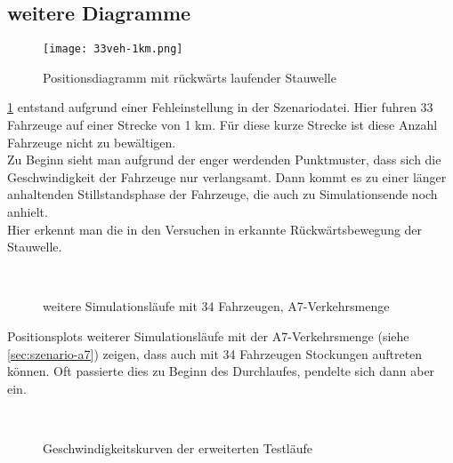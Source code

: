 \newpage

\subsection{weitere Diagramme}


\begin{figure}[hptb]
 \centering
 \texttt{[image: 33veh-1km.png]}
 \caption{Positionsdiagramm mit rückwärts laufender Stauwelle}
 \label{figure:33veh-1km}
\end{figure}

\cref{figure:33veh-1km} entstand aufgrund einer Fehleinstellung in der Szenariodatei.
Hier fuhren 33 Fahrzeuge auf einer Strecke von 1 km.
Für diese kurze Strecke ist diese Anzahl Fahrzeuge nicht zu bewältigen.
\\
Zu Beginn sieht man aufgrund der enger werdenden Punktmuster, dass sich die Geschwindigkeit der Fahrzeuge nur verlangsamt. Dann kommt es zu einer länger anhaltenden Stillstandsphase der Fahrzeuge, die auch zu Simulationsende noch anhielt.
\\
Hier erkennt man die in den Versuchen in \cite{na-sch} erkannte Rückwärtsbewegung der Stauwelle.


\newpage


\begin{figure}[hptb]
  \centering
    \\
  \caption{weitere Simulationsläufe mit 34 Fahrzeugen, A7-Verkehrsmenge}
  \label{figure:a7-34veh-more}
\end{figure}

Positionsplots weiterer Simulationsläufe mit der A7-Verkehrsmenge (siehe \cref{sec:szenario-a7}) zeigen, dass auch mit 34 Fahrzeugen Stockungen auftreten können.
Oft passierte dies zu Beginn des Durchlaufes, pendelte sich dann aber ein.


\newpage


\begin{figure}[hptb]
  \centering
   \qquad 
   \qquad 
    \\
  \caption{Geschwindigkeitskurven der erweiterten Testläufe}
  \label{figure:short-a7}
\end{figure}

